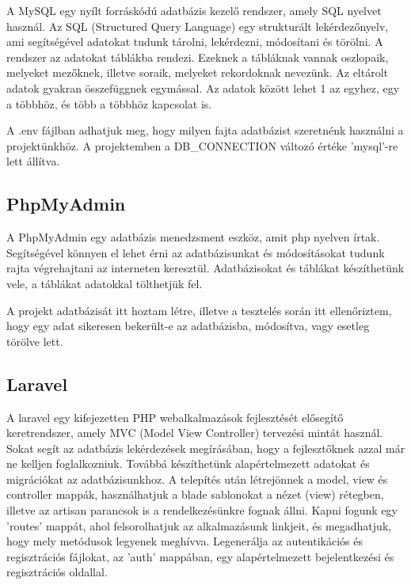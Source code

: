 \documentclass[
]{thesis-ekf}
\theoremstyle{definition}
\theoremstyle{remark}
\begin{document}
A MySQL egy nyílt forráskódú adatbázis kezelő rendszer, amely SQL nyelvet használ. Az SQL (Structured Query Language) egy strukturált lekérdezőnyelv, ami segítségével adatokat tudunk tárolni, lekérdezni, módosítani és törölni. A rendszer az adatokat táblákba rendezi. Ezeknek a tábláknak vannak oszlopaik, melyeket mezőknek, illetve soraik, melyeket rekordoknak nevezünk. Az eltárolt adatok gyakran összefüggnek egymással. Az adatok között lehet 1 az egyhez, egy a többhöz, és több a többhöz kapcsolat is.


\vspace{5mm}

A .env fájlban adhatjuk meg, hogy milyen fajta adatbázist szeretnénk használni a projektünkhöz. A projektemben a DB\_CONNECTION változó értéke 'mysql'-re lett állítva.

\subsection{PhpMyAdmin}

A PhpMyAdmin egy adatbázis menedzsment eszköz, amit php nyelven írtak. Segítségével könnyen el lehet érni az adatbázisunkat és módosításokat tudunk rajta végrehajtani az interneten keresztül. Adatbázisokat és táblákat készíthetünk vele, a táblákat adatokkal tölthetjük fel.

A projekt adatbázisát itt hoztam létre, illetve a tesztelés során itt ellenőriztem, hogy egy adat sikeresen bekerült-e az adatbázisba, módosítva, vagy esetleg törölve lett.

\subsection{Laravel}

A laravel egy kifejezetten PHP webalkalmazások fejlesztését elősegítő keretrendszer, amely MVC (Model View Controller) tervezési mintát használ.
Sokat segít az adatbázis lekérdezések megírásában, hogy a fejlesztőknek azzal már ne kelljen foglalkozniuk. Továbbá készíthetünk alapértelmezett adatokat és migrációkat az adatbázisunkhoz.
A telepítés után létrejönnek a model, view és controller mappák, használhatjuk a blade sablonokat a nézet (view) rétegben, illetve az artisan parancsok is a rendelkezésünkre fognak állni.
Kapni fogunk egy 'routes' mappát, ahol felsorolhatjuk az alkalmazásunk linkjeit, és megadhatjuk, hogy mely metódusok legyenek meghívva.
Legenerálja az autentikációs és regisztrációs fájlokat, az 'auth' mappában, egy alapértelmezett bejelentkezési és regisztrációs oldallal.
\end{document}
